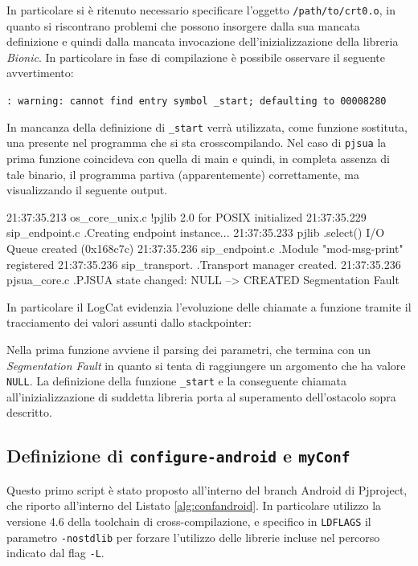 In particolare si è ritenuto necessario specificare l'oggetto \texttt{\small /path/to/crt0.o},
in quanto si riscontrano problemi che possono
insorgere dalla sua mancata definizione e quindi dalla mancata invocazione
dell'inizializzazione della libreria \textit{Bionic}. In particolare in fase di compilazione
è possibile osservare il seguente avvertimento:
\begin{center}
\texttt{\small : warning: cannot find entry symbol \_start; defaulting to 00008280}
\end{center}
In mancanza della definizione di \texttt{\small \_start} verrà utilizzata, come 
funzione sostituta, una presente nel  programma che si sta crosscompilando.
Nel caso di \texttt{\small pjsua} la prima funzione coincideva con quella di main
e quindi, in completa assenza di tale binario, il programma partiva (apparentemente) correttamente, ma visualizzando il
seguente output.
\begin{bash}
21:37:35.213 os_core_unix.c !pjlib 2.0 for POSIX initialized
21:37:35.229 sip_endpoint.c  .Creating endpoint instance...
21:37:35.233          pjlib  .select() I/O Queue created (0x168c7c)
21:37:35.236 sip_endpoint.c  .Module "mod-msg-print" registered
21:37:35.236 sip_transport.  .Transport manager created.
21:37:35.236   pjsua_core.c  .PJSUA state changed: NULL --> CREATED
Segmentation Fault
\end{bash}
In particolare il LogCat evidenzia l'evoluzione delle chiamate a funzione
tramite il tracciamento dei valori assunti dallo stackpointer:
Nella prima funzione avviene il parsing dei parametri, che termina
con un \textit{Segmentation Fault} in quanto si tenta di raggiungere un argomento che ha
valore \texttt{NULL}. La definizione della funzione \texttt{\_start} e la conseguente
chiamata all'inizializzazione di suddetta libreria porta al superamento dell'ostacolo
sopra descritto.


\subsection{Definizione di \texttt{configure-android} e \texttt{myConf}}
Questo primo script è stato proposto all'interno del branch Android di Pjproject, che
riporto all'interno del Listato \vref{alg:confandroid}. In particolare
utilizzo la versione 4.6 della toolchain di cross-compilazione,
e specifico in \texttt{\small LDFLAGS} il parametro \texttt{\small -nostdlib} per
forzare l'utilizzo delle librerie incluse nel percorso indicato dal flag \texttt{\small -L}.

